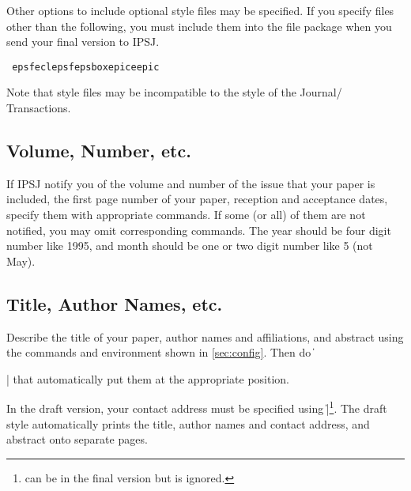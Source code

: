 Other options to include optional style files may be specified.  If you
specify files other than the following, you must include them into the file
package when you send your final version to IPSJ.
%
\begin{Quote}\raggedright\tt
epsf\qquad eclepsf\qquad epsbox\qquad epic\qquad eepic
\end{Quote}
%
Note that style files may be incompatible to the style of the Journal\slash
Transactions.

\subsection{Volume, Number, etc.}

If IPSJ notify you of the volume and number of the issue that your paper is
included, the first page number of your paper, reception and acceptance
dates, specify them with appropriate commands.  If some (or all) of them are
not notified, you may omit corresponding commands.  The {\<year\>} should
be four digit number like 1995, and {\<month\>} should be one or two
digit number like 5 (not May).


\subsection{Title, Author Names, etc.}\label{sec:Desc}\label{sec:desc}

Describe the title of your paper, author names and affiliations, and
abstract using the commands and environment shown in \ref{sec:config}.  Then
do \|\maketitle| that automatically put them at the appropriate position.

In the draft version, your contact address must be specified using
\|\contact|\footnote{\cs{\contact} can be in the final version but is
ignored.}.  The draft style automatically prints the title, author names and
contact address, and abstract onto separate pages.

